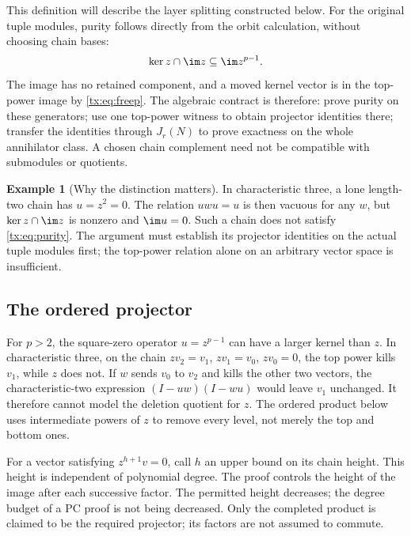 \documentclass[11pt,a4paper,oneside,openany]{book}
\theoremstyle{definition}\newtheorem{definition}[theorem]{Definition}
\newtheorem{example}[theorem]{Example}
\theoremstyle{remark}\newtheorem{remark}[theorem]{Remark}
\numberwithin{equation}{chapter}
\begin{document}
This definition will describe the layer splitting constructed below.
For the original tuple modules, purity follows directly from the orbit
calculation, without choosing chain bases:
\begin{equation}\label{tx:eq:purity}\ker z\cap\im z\subseteq\im z^{p-1}.
\end{equation}
The image has no retained component, and a moved kernel vector is in
the top-power image by \eqref{tx:eq:freep}. The algebraic contract is
therefore: prove purity on these generators; use one top-power witness
to obtain projector identities there; transfer the identities through
$J_r(N)$ to prove exactness on the whole annihilator class. A chosen
chain complement need not be compatible with submodules or quotients.

\begin{example}[Why the distinction matters]
In characteristic three, a lone length-two chain has $u=z^2=0$. The relation $uwu=u$ is then vacuous for any $w$, but $\ker z\cap\im z$ is nonzero and $\im u=0$. Such a chain does not satisfy \eqref{tx:eq:purity}. The argument must establish its projector identities on the actual tuple modules first; the top-power relation alone on an arbitrary vector space is insufficient.
\end{example}

\subsection{The ordered projector}
For $p>2$, the square-zero operator $u=z^{p-1}$ can have a larger
kernel than $z$. In characteristic three, on the chain $zv_2=v_1$,
$zv_1=v_0$, $zv_0=0$, the top power kills $v_1$, while $z$ does not. If $w$
sends $v_0$ to $v_2$ and kills the other two vectors, the
characteristic-two expression $(I-uw)(I-wu)$ would leave $v_1$
unchanged. It therefore cannot model the deletion quotient for $z$.
The ordered product below uses intermediate powers of $z$ to remove
every level, not merely the top and bottom ones.

For a vector satisfying $z^{h+1}v=0$, call $h$ an upper bound on
its chain height. This height is independent of polynomial degree.
The proof controls the height of the image after each successive
factor. The permitted height decreases; the degree budget of a PC
proof is not being decreased. Only the completed product is claimed
to be the required projector; its factors are not assumed to commute.
\end{document}
